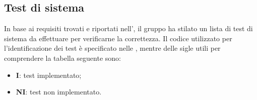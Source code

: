 \subsection{Test di sistema}
In base ai requisiti trovati e riportati nell'\AdRv{}, il gruppo ha stilato un lista di test di sistema da effettuare per verificarne la correttezza.
Il codice utilizzato per l'identificazione dei test è specificato nelle \NdP, mentre delle sigle utili per comprendere la tabella seguente sono:
\begin{itemize}
	\item \textbf{I}: test implementato;
	\item \textbf{NI}: test non implementato.
\end{itemize} 

\newpage
\renewcommand{\arraystretch}{1.5}
\renewcommand{\arraystretch}{1.5}
\renewcommand\extrarowheight{1.5pt}
